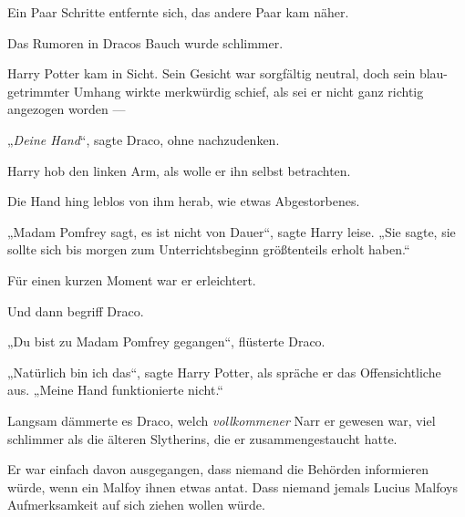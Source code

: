Ein Paar Schritte entfernte sich, das andere Paar kam näher.

Das Rumoren in Dracos Bauch wurde schlimmer.

Harry Potter kam in Sicht. Sein Gesicht war sorgfältig neutral, doch sein blau-getrimmter Umhang wirkte merkwürdig schief, als sei er nicht ganz richtig angezogen worden —

„\emph{Deine Hand}“, sagte Draco, ohne nachzudenken.

Harry hob den linken Arm, als wolle er ihn selbst betrachten.

Die Hand hing leblos von ihm herab, wie etwas Abgestorbenes.

„Madam Pomfrey sagt, es ist nicht von Dauer“, sagte Harry leise.
„Sie sagte, sie sollte sich bis morgen zum Unterrichtsbeginn größtenteils erholt haben.“

Für einen kurzen Moment war er erleichtert.

Und dann begriff Draco.

„Du bist zu Madam Pomfrey gegangen“, flüsterte Draco.

„Natürlich bin ich das“, sagte Harry Potter, als spräche er das Offensichtliche aus.
„Meine Hand funktionierte nicht.“

Langsam dämmerte es Draco, welch \emph{vollkommener} Narr er gewesen war, viel schlimmer als die älteren Slytherins, die er zusammengestaucht hatte.

Er war einfach davon ausgegangen, dass niemand die Behörden informieren würde, wenn ein Malfoy ihnen etwas antat. Dass niemand jemals Lucius Malfoys Aufmerksamkeit auf sich ziehen wollen würde.

